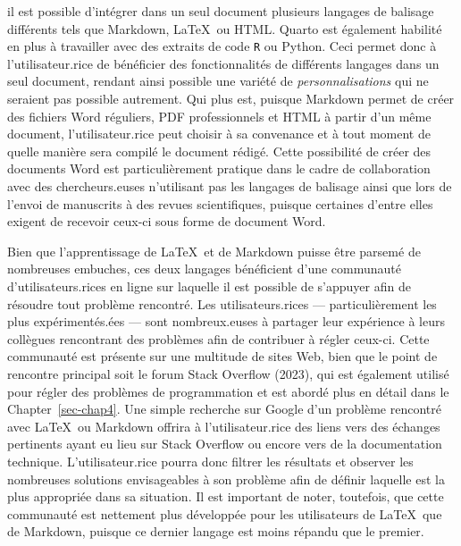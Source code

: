 \documentclass[
  letterpaper,
]{scrbook}
\begin{document}
 il est possible
d'intégrer dans un seul document plusieurs langages de balisage
différents tels que Markdown, \LaTeX~ou HTML. Quarto est également
habilité en plus à travailler avec des extraits de code \texttt{R} ou
Python. Ceci permet donc à l'utilisateur.rice de bénéficier des
fonctionnalités de différents langages dans un seul document, rendant
ainsi possible une variété de \emph{personnalisations} qui ne seraient
pas possible autrement. Qui plus est, puisque Markdown permet de créer
des fichiers Word réguliers, PDF professionnels et HTML à partir d'un
même document, l'utilisateur.rice peut choisir à sa convenance et à tout
moment de quelle manière sera compilé le document rédigé. Cette
possibilité de créer des documents Word est particulièrement pratique
dans le cadre de collaboration avec des chercheurs.euses n'utilisant pas
les langages de balisage ainsi que lors de l'envoi de manuscrits à des
revues scientifiques, puisque certaines d'entre elles exigent de
recevoir ceux-ci sous forme de document Word.

Bien que l'apprentissage de \LaTeX~et de Markdown puisse être parsemé de
nombreuses embuches, ces deux langages bénéficient d'une communauté
d'utilisateurs.rices en ligne sur laquelle il est possible de s'appuyer
afin de résoudre tout problème rencontré. Les utilisateurs.rices ---
particulièrement les plus expérimentés.ées --- sont nombreux.euses à
partager leur expérience à leurs collègues rencontrant des problèmes
afin de contribuer à régler ceux-ci. Cette communauté est présente sur
une multitude de sites Web, bien que le point de rencontre principal
soit le forum Stack Overflow (2023), qui est également utilisé pour
régler des problèmes de programmation et est abordé plus en détail dans
le Chapter~\ref{sec-chap4}. Une simple recherche sur Google d'un
problème rencontré avec \LaTeX~ou Markdown offrira à l'utilisateur.rice
des liens vers des échanges pertinents ayant eu lieu sur Stack Overflow
ou encore vers de la documentation technique. L'utilisateur.rice pourra
donc filtrer les résultats et observer les nombreuses solutions
envisageables à son problème afin de définir laquelle est la plus
appropriée dans sa situation. Il est important de noter, toutefois, que
cette communauté est nettement plus développée pour les utilisateurs de
\LaTeX~que de Markdown, puisque ce dernier langage est moins répandu que
le premier.
\end{document}
